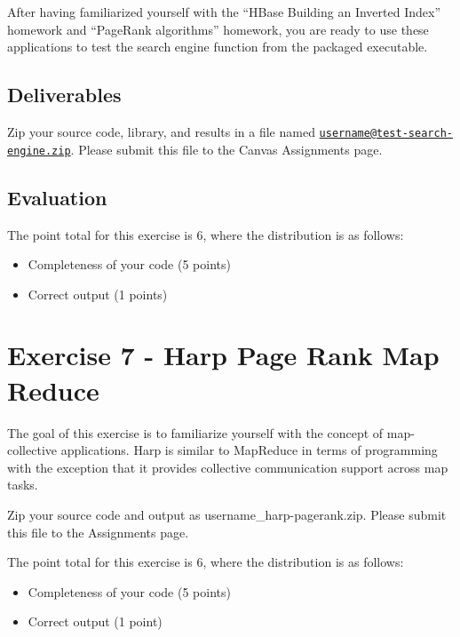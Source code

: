 After having familiarized yourself with the ``HBase Building an Inverted
Index'' homework and ``PageRank algorithms'' homework, you are ready to
use these applications to test the search engine function from the
packaged executable.

\section*{Deliverables}\label{deliverables}

Zip your source code, library, and results in a file named
\href{mailto:username@test-search-engine.zip}{\nolinkurl{username@test-search-engine.zip}}.
Please submit this file to the Canvas Assignments page.

\FILENAME

\section*{Evaluation}\label{evaluation}

The point total for this exercise is 6, where the distribution is as
follows:

\begin{itemize}
\tightlist
\item
  Completeness of your code (5 points)
\item
  Correct output (1 points)
\end{itemize}





\chapter{Exercise 7 - Harp Page Rank Map Reduce}\label{project-7}

The goal of this exercise is to familiarize yourself with the concept of
map-collective applications. Harp is similar to MapReduce in terms of
programming with the exception that it provides collective communication
support across map tasks.

Zip your source code and output as username\_harp-pagerank.zip. Please
submit this file to the Assignments page.

The point total for this exercise is 6, where the distribution is as
follows:

\begin{itemize}
\tightlist
\item
  Completeness of your code (5 points)
\item
  Correct output (1 point)
\end{itemize}

